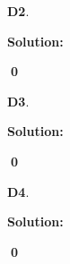 \documentclass{article}
\newenvironment{problem}[1]
{
  \begin{flushleft}
  \textbf{#1}.
  \ignorespaces
}
{
  \end{flushleft}
}
\newenvironment{solution}
{
  \ignorespaces
  \textbf{Solution:}
}
{
  \ignorespacesafterend
  \begin{flushright}
  {\bfseries \qed}
  \end{flushright}
}
\begin{document}
\begin{problem}{D2}

\end{problem}
\begin{solution}

\end{solution}

\begin{problem}{D3}

\end{problem}
\begin{solution}

\end{solution}

\begin{problem}{D4}

\end{problem}
\begin{solution}

\end{solution}
\end{document}
